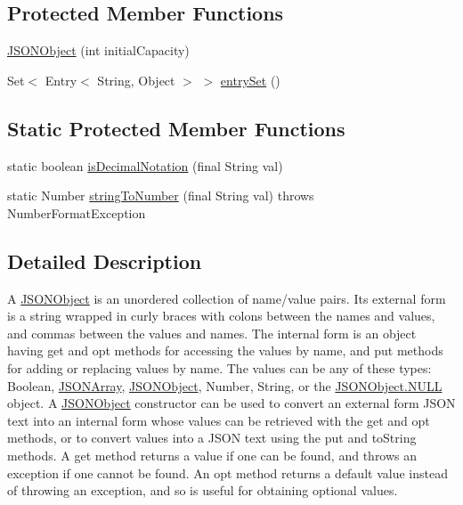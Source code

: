\subsection*{Protected Member Functions}
\begin{DoxyCompactItemize}
\item 
\hyperlink{classorg_1_1json_1_1JSONObject_a4e9429020d2998c7be3de1ab691dd67f}{J\-S\-O\-N\-Object} (int initial\-Capacity)
\item 
Set$<$ Entry$<$ String, Object $>$ $>$ \hyperlink{classorg_1_1json_1_1JSONObject_a004c3da5b5bfc5fc768cc1346afb4ac1}{entry\-Set} ()
\end{DoxyCompactItemize}
\subsection*{Static Protected Member Functions}
\begin{DoxyCompactItemize}
\item 
static boolean \hyperlink{classorg_1_1json_1_1JSONObject_a17e05be71de51c2af80323ceda1a5449}{is\-Decimal\-Notation} (final String val)
\item 
static Number \hyperlink{classorg_1_1json_1_1JSONObject_a0c62c982cd3f51d62218599feabc04b7}{string\-To\-Number} (final String val)  throws Number\-Format\-Exception 
\end{DoxyCompactItemize}


\subsection{Detailed Description}
A \hyperlink{classorg_1_1json_1_1JSONObject}{J\-S\-O\-N\-Object} is an unordered collection of name/value pairs. Its external form is a string wrapped in curly braces with colons between the names and values, and commas between the values and names. The internal form is an object having {\ttfamily get} and {\ttfamily opt} methods for accessing the values by name, and {\ttfamily put} methods for adding or replacing values by name. The values can be any of these types\-: {\ttfamily Boolean}, {\ttfamily \hyperlink{classorg_1_1json_1_1JSONArray}{J\-S\-O\-N\-Array}}, {\ttfamily \hyperlink{classorg_1_1json_1_1JSONObject}{J\-S\-O\-N\-Object}}, {\ttfamily Number}, {\ttfamily String}, or the {\ttfamily \hyperlink{classorg_1_1json_1_1JSONObject_a01c74a31a1abfd34ab13beb9347855ac}{J\-S\-O\-N\-Object.\-N\-U\-L\-L}} object. A \hyperlink{classorg_1_1json_1_1JSONObject}{J\-S\-O\-N\-Object} constructor can be used to convert an external form J\-S\-O\-N text into an internal form whose values can be retrieved with the {\ttfamily get} and {\ttfamily opt} methods, or to convert values into a J\-S\-O\-N text using the {\ttfamily put} and {\ttfamily to\-String} methods. A {\ttfamily get} method returns a value if one can be found, and throws an exception if one cannot be found. An {\ttfamily opt} method returns a default value instead of throwing an exception, and so is useful for obtaining optional values. 

